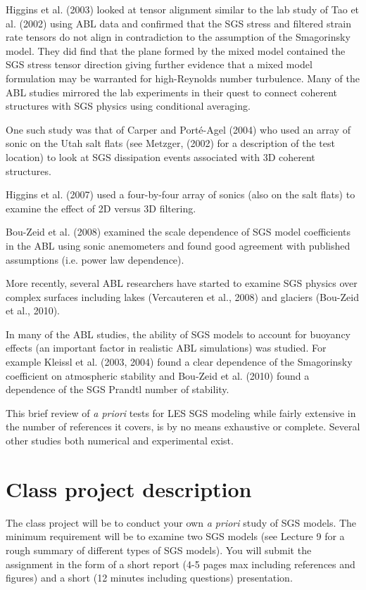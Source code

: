 \documentclass[11pt]{article}
\begin{document}
Higgins et al. (2003) looked at tensor alignment similar to the lab study of Tao et al. (2002) using ABL data and confirmed that the SGS stress and filtered strain rate tensors do not align in contradiction to the assumption of the Smagorinsky model. They did find that the plane formed by the mixed model contained the SGS stress tensor direction giving further evidence that a mixed model formulation may be warranted for high-Reynolds number turbulence. Many of the ABL studies mirrored the lab experiments in their quest to connect coherent structures with SGS physics using conditional averaging. 

One such study was that of Carper and Port\'e-Agel (2004) who used an array of sonic on the Utah salt flats (see Metzger, (2002) for a description of the test location) to look at SGS dissipation events associated with 3D coherent structures.  

Higgins et al. (2007) used a four-by-four array of sonics (also on the salt flats) to examine the effect of 2D versus 3D filtering.  

Bou-Zeid et al. (2008) examined the scale dependence of SGS model coefficients in the ABL using sonic anemometers and found good agreement with published assumptions (i.e. power law dependence). 

More recently, several ABL researchers have started to examine SGS physics over complex surfaces including lakes (Vercauteren et al., 2008) and glaciers (Bou-Zeid et al., 2010). 

In many of the ABL studies, the ability of SGS models to account for buoyancy effects (an important factor in realistic ABL simulations) was studied.  For example Kleissl et al. (2003, 2004) found a clear dependence of the Smagorinsky coefficient on atmospheric stability and Bou-Zeid et al. (2010) found a dependence of the SGS Prandtl number of stability.

This brief review of {\it a priori} tests for LES SGS modeling while fairly extensive in the number of  references it covers, is by no means exhaustive or complete.  Several other studies both numerical and experimental exist.

\section*{Class project description}

The class project will be to conduct your own {\it a priori} study of SGS models.  The minimum requirement will be to examine two SGS models (see Lecture  9 for a rough summary of different types of SGS models). You will submit the assignment in the form of a short report (4-5 pages max including references and figures) and a short (12 minutes including questions) presentation.
\end{document}
